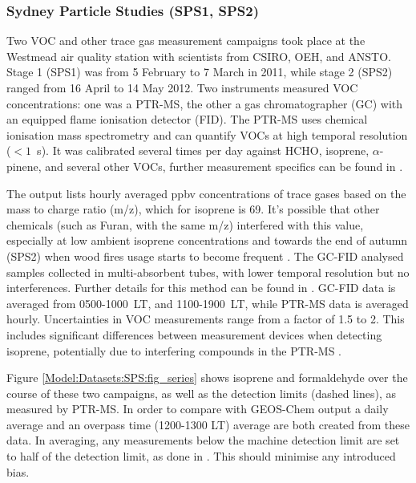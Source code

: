     \subsubsection{Sydney Particle Studies (SPS1, SPS2)}
      \label{Model:Datasets:SPS}
      Two VOC and other trace gas measurement campaigns took place at the Westmead air quality station with scientists from CSIRO, OEH, and ANSTO. 
      Stage 1 (SPS1) was from 5 February to 7 March in 2011, while stage 2 (SPS2) ranged from 16 April to 14 May 2012.
      Two instruments measured VOC concentrations: one was a PTR-MS, the other a gas chromatographer (GC) with an equipped flame ionisation detector (FID).
      The PTR-MS uses chemical ionisation mass spectrometry and can quantify VOCs at high temporal resolution ($< 1$~s).
      It was calibrated several times per day against HCHO, isoprene, $\alpha$-pinene, and several other VOCs, further measurement specifics can be found in \textcite{Dunne2012, Dunne2018}.
      
      The output lists hourly averaged ppbv concentrations of trace gases based on the mass to charge ratio (m/z), which for isoprene is 69.
      It's possible that other chemicals (such as Furan, with the same m/z) interfered with this value, especially at low ambient isoprene concentrations and towards the end of autumn (SPS2) when wood fires usage starts to become frequent \parencite{Guerette2018}.
      The GC-FID analysed samples collected in multi-absorbent tubes, with lower temporal resolution but no interferences. 
      Further details for this method can be found in \textcite{Cheng2016}.
      GC-FID data is averaged from 0500-1000~LT, and 1100-1900~LT, while PTR-MS data is averaged hourly.
      Uncertainties in VOC measurements range from a factor of 1.5 to 2.
      This includes significant differences between measurement devices when detecting isoprene, potentially due to interfering compounds in the PTR-MS \parencite{Dunne2018}.
      
      Figure \ref{Model:Datasets:SPS:fig_series} shows isoprene and formaldehyde over the course of these two campaigns, as well as the detection limits (dashed lines), as measured by PTR-MS. 
      In order to compare with GEOS-Chem output a daily average and an overpass time (1200-1300 LT) average are both created from these data.
      In averaging, any measurements below the machine detection limit are set to half of the detection limit, as done in \textcite{Lawson2015}. 
      This should minimise any introduced bias.
      
